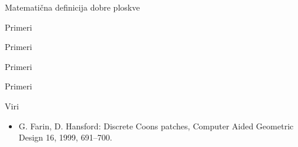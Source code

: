 \documentclass{beamer}
\begin{document}
\begin{frame}{Matematična definicija dobre ploskve}
    \begin{center}
    \resizebox*{!}{13em}{}
    \end{center}
\end{frame}

\begin{frame}{Primeri}
    \begin{center}
    \resizebox*{!}{13em}{}
    \end{center}
\end{frame}

\begin{frame}{Primeri}
    \begin{center}
    \resizebox*{!}{13em}{}
    \end{center}
\end{frame}

\begin{frame}{Primeri}
    \begin{center}
    \resizebox*{!}{13em}{}
    \end{center}
\end{frame}

\begin{frame}{Primeri}
    \begin{center}
    \resizebox*{!}{13em}{}
    \end{center}
\end{frame}

\begin{frame}{Viri}

\begin{itemize}
    \item G. Farin, D. Hansford: Discrete Coons patches, Computer Aided Geometric Design 16, 1999, 691–700.
\end{itemize}
    
\end{frame}
\end{document}
